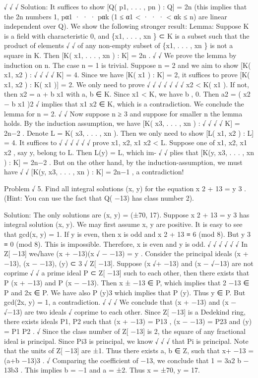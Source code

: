\documentclass[UTF8,12pt]{ctexart}
\begin{document}
√ √ √ Solution: It suffices to show [Q( p1, . . . , pn ) : Q] = 2n (this implies that the 2n numbers 1, pα1 · · · pαk (1 ≤ α1 < · · · < αk ≤ n) are linear independent over Q). We show the following stronger result: Lemma: Suppose K is a field with characteristic 0, and \{x1, . . . , xn \} ⊂ K is a subset such that the product of elements √ √ of any non-empty subset of \{x1, . . . , xn \} is not a square in K. Then [K( x1, . . . , xn ) : K] = 2n . √ √ We prove the lemma by induction on n. The case n = 1 is trivial. Suppose n = 2 and we aim to show [K( x1, x2 ) : √ √ √ √ K] = 4. Since we have [K( x1 ) : K] = 2, it suffices to prove [K( x1, x2 ) : K( x1 )] = 2. We only need to prove √ √ √ √ √ √ √ x2 < K( x1 ). If not, then x2 = a + b x1 with a, b ∈ K. Since x1 < K, we have b , 0. Then a2 = ( x2 − b x1 )2 √ implies that x1 x2 ∈ K, which is a contradiction. We conclude the lemma for n = 2. √ √ Now suppose n ≥ 3 and suppose for smaller n the lemma holds. By the induction assumption, we have [K( x3, . . . , xn ) : √ √ √ √ K] = 2n−2 . Denote L = K( x3, . . . , xn ). Then we only need to show [L( x1, x2 ) : L] = 4. It suffices to √ √ √ √ √ √ prove x1, x2, x1 x2 < L. Suppose one of x1, x2, x1 x2 , say y, belong to L. Then L(y) = L, which im- √ √ plies that [K(y, x3, . . . , xn ) : K] = 2n−2 . But on the other hand, by the induction-assumption, we must have √ √ [K(y, x3, . . . , xn ) : K] = 2n−1 , a contradiction!

Problem √ 5. Find all integral solutions (x, y) for the equation x 2 + 13 = y 3 . (Hint: You can use the fact that Q( −13) has class number 2).

Solution: The only solutions are (x, y) = (±70, 17). Suppose x 2 + 13 = y 3 has integral solution (x, y). We may first assume x, y are positive. It is easy to see that gcd(x, y) = 1. If y is even, then x is odd and x 2 + 13 ≡ 6 (mod 8). But y 3 ≡ 0 (mod 8). This is impossible. Therefore, x is even and y is odd. √ √ √ √ √ √ In Z[ −13] we√have (x + −13)(x √ − −13) = y . Consider the principal ideals (x + −13), (x − −13), (y) ⊂ 3 √ Z[ −13]. Suppose (x √+ −13) and (x − √−13) are not coprime √ √ a prime ideal P ⊂ Z[ −13] such to each other, then there exists that P (x + −13) and P (x − −13). Then x ± −13 ∈ P, which implies that 2 −13 ∈ P and 2x ∈ P. We have also P (y)3 which implies that P (y). Thus y ∈ P. But gcd(2x, y) = 1, a contradiction. √ √ √ We conclude that (x + −13) and (x − √−13) are two ideals √ coprime to each other. Since Z[ −13] is a Dedekind ring, there exists ideals P1, P2 such that (x + −13) = P13 , (x − −13) = P23 and (y) = P1 P2 . √ Since the class number of Z[ −13] is 2, the square of any fractional ideal is principal. Since Pi3 is principal, we know √ √ √ that Pi is principal. Note that the units of Z[ −13] are ±1. Thus there exists a, b ∈ Z, such that x+ −13 = (a+b −13)3 . √ Comparing the coefficient of −13, we conclude that 1 = 3a2 b − 13b3 . This implies b = −1 and a = ±2. Thus x = ±70, y = 17.
\end{document}
